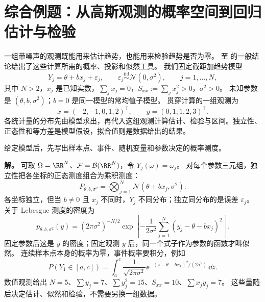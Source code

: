 \section{综合例题：从高斯观测的概率空间到回归估计与检验}
\label{sec:ms-gaussian-observation-comprehensive}

一组带噪声的观测既能用来估计趋势，也能用来检验趋势是否为零。
 至 的一般结论给出了这些计算所需的概率、投影和似然工具。
我们固定截距加趋势模型
\[
 Y_j=\theta+b x_j+\varepsilon_j,\qquad
 \varepsilon_j\overset{\mathrm{iid}}\sim\mathcal N(0,\sigma^2),
 \qquad j=1,\ldots,N,
\]
其中 $N>2$，$x_j$ 是已知实数，$\sum_jx_j=0$，$S_{xx}:=\sum_jx_j^2>0$，$\sigma^2>0$。
未知参数是 $(\theta,b,\sigma^2)$；$b=0$ 是同一模型的常均值子模型。
贯穿计算的一组观测为
\[
 x=(-2,-1,0,1,2)^{\mathsf T},\qquad
 y=(0,1,1,2,3)^{\mathsf T}.
\]
各统计量的分布先由模型求出，再代入这组观测计算估计、检验与区间。独立性、正态性和等方差是模型假设，拟合值则是数据给出的结果。

\begin{exbox}
给定模型后，先写出样本点、事件、随机变量和参数决定的概率测度。

\textbf{解。} 可取 $\Omega=\RR^N$、$\mathcal F=\mathcal B(\RR^N)$，令 $Y_j(\omega)=\omega_j$。
对每个参数三元组，独立性把各坐标的正态测度组合为乘积测度：
\[
 P_{\theta,b,\sigma^2}=\bigotimes_{j=1}^N
 \mathcal N(\theta+b x_j,\sigma^2).
\]
各坐标独立，但当 $b\ne0$ 且 $x_j$ 不同时，$Y_j$ 不同分布；独立同分布的是误差 $\varepsilon_j$。
关于 Lebesgue 测度的密度为
\[
 p_{\theta,b,\sigma^2}(y)
 =(2\pi\sigma^2)^{-N/2}
 \exp\left[-\frac1{2\sigma^2}\sum_{j=1}^N(y_j-\theta-b x_j)^2\right].
\]
固定参数后这是 $y$ 的密度；固定观测 $y$ 后，同一个式子作为参数的函数才叫似然。
连续样本点本身的概率为零，事件概率要积分，例如
\[
 P(Y_1\in[a,c])=\int_a^c
 \frac1{\sqrt{2\pi\sigma^2}}
 \ee^{-(z-\theta-bx_1)^2/(2\sigma^2)}\,\dd z.
\]
数值观测给出 $N=5$、$\sum y_j=7$、$\sum y_j^2=15$、$S_{xx}=10$、$\sum x_jy_j=7$。
这些量随后决定估计、似然和检验，不需要另换一组数据。
\end{exbox}

